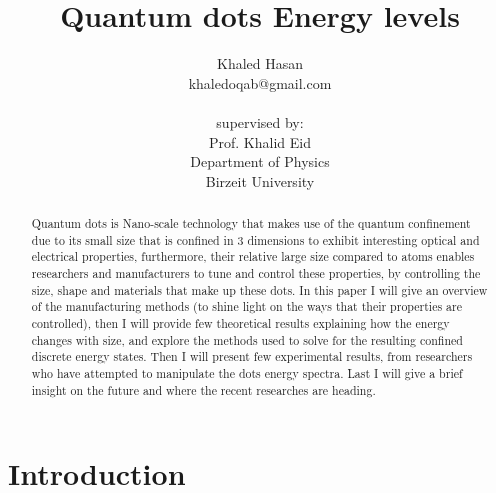 \documentclass[twoside,11pt]{article}
\begin{document}
\title{Quantum dots Energy levels}

\author{
        \name Khaled Hasan \\ \email khaledoqab@gmail.com \\ \vspace{2cm}\\
        supervised by:\\ Prof. Khalid Eid\\
        \vspace{10cm}
       \addr Department of Physics\\
       Birzeit University
       }

\maketitle
\newpage
\begin{abstract}%
    Quantum dots is Nano-scale technology that makes use of the quantum confinement due to its small size that is confined in 3 dimensions to exhibit interesting optical and electrical properties, furthermore, their relative large size compared to atoms enables researchers and manufacturers to tune and control these properties, by controlling the size, shape and materials that make up these dots. In this paper I will give an overview of the manufacturing methods (to shine light on the ways that their properties are controlled), then I will provide few theoretical results explaining how the energy changes with size, and explore the methods used to solve for the resulting confined discrete energy states. Then I will present few experimental results, from researchers who have attempted to manipulate the dots energy spectra. Last I will give a brief insight on the future and where the recent researches are heading. 
\end{abstract}


\section{Introduction}
\end{document}
